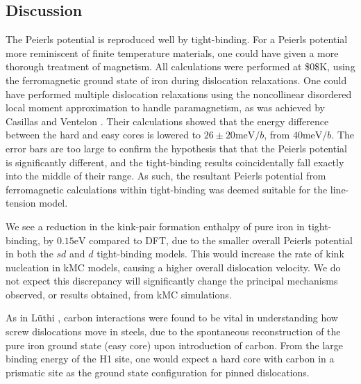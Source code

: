 \documentclass[a4paper,11pt]{article}
\numberwithin{equation}{chapter}
\numberwithin{listing}{chapter}
\begin{document}
\subsection{Discussion}
\label{sec:org5adb164}
\label{sec:discussion}





The Peierls potential is reproduced well by tight-binding. For a Peierls potential more
reminiscent of finite temperature materials, one could have given a more thorough treatment of
magnetism. All calculations were performed at \$0\textdegree{}\$K, using the ferromagnetic ground state of
iron during dislocation relaxations. One could have performed multiple dislocation relaxations
using the noncollinear disordered local moment approximation to handle paramagnetism, as was
achieved by Casillas and Ventelon \cite{Casillas-Trujillo2020}. Their calculations showed that the
energy difference between the hard and easy cores is lowered to \(26 \pm 20\text{meV/}b\), from
\(40 \text{meV/}b\). The error bars are too large to confirm the hypothesis that that the Peierls
potential is significantly different, and the tight-binding results coincidentally fall exactly
into the middle of their range. As such, the resultant Peierls potential from ferromagnetic
calculations within tight-binding was deemed suitable for the line-tension model.

We see a reduction in the kink-pair formation enthalpy of pure iron in tight-binding,
by \(0.15 \text{eV}\) compared to DFT, due to the smaller overall Peierls potential in
both the \(sd\) and \(d\) tight-binding models. This would increase the rate of kink
nucleation in kMC models, causing a higher overall dislocation velocity. We do not
expect this discrepancy will significantly change the principal mechanisms observed,
or results obtained, from kMC simulations.


As in Lüthi \cite{Lthi2019}, carbon interactions were found to be vital in understanding how screw
dislocations move in steels, due to the spontaneous reconstruction of the pure iron ground state
(easy core) upon introduction of carbon. From the large binding energy of the H1 site, one would
expect a hard core with carbon in a prismatic site as the ground state configuration for pinned
dislocations.
\end{document}
